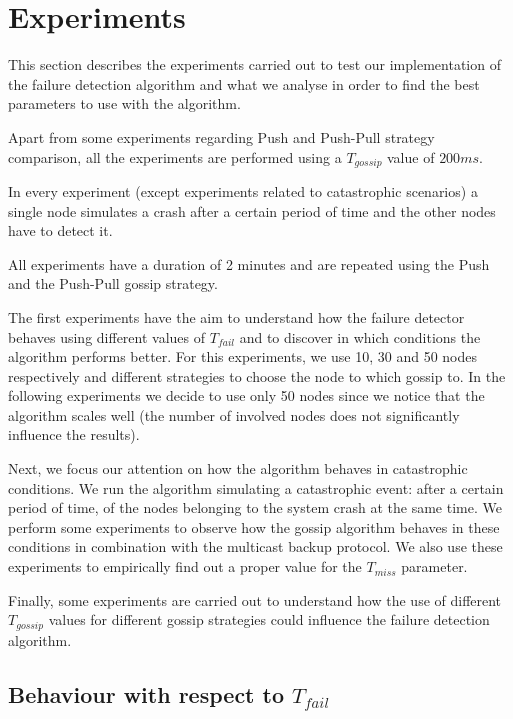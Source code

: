 \section{Experiments}
\label{sec:experiments}

This section describes the experiments carried out to test our implementation of the failure detection algorithm and what we analyse in order to find the best parameters to use with the algorithm.

Apart from some experiments regarding Push and Push-Pull strategy comparison, all the experiments are performed using a $T_{gossip}$ value of $200 \si{ms}$.

In every experiment (except experiments related to catastrophic scenarios) a single node simulates a crash after a certain period of time and the other nodes have to detect it.

All experiments have a duration of 2 minutes and are repeated using the Push and the Push-Pull gossip strategy.

The first experiments have the aim to understand how the failure detector behaves using different values of  $T_{fail}$ and to discover in which conditions the algorithm performs better.
For this experiments, we use 10, 30 and 50 nodes respectively and different strategies to choose the node to which gossip to.
In the following experiments we decide to use only 50 nodes since we notice that the algorithm scales well (the number of involved nodes does not significantly influence the results).

Next, we focus our attention on how the algorithm behaves in catastrophic conditions.
We run the algorithm simulating a catastrophic event: after a certain period of time,  of the nodes belonging to the system crash at the same time.
We perform some experiments to observe how the gossip algorithm behaves in these conditions in combination with the multicast backup protocol.
We also use these experiments to empirically find out a proper value for the $T_{miss}$ parameter.

Finally, some experiments are carried out to understand how the use of different $T_{gossip}$ values for different gossip strategies could influence the failure detection algorithm.


\subsection*{Behaviour with respect to $T_{fail}$}

